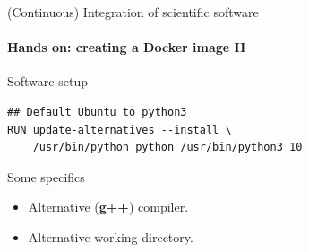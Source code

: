 \begin{frame}[fragile]{(Continuous) Integration of scientific software} 
    \framesubtitle{Hands on: creating a Docker image II} 
    \vfill

    Software setup  

    \begin{verbatim}
## Default Ubuntu to python3
RUN update-alternatives --install \
    /usr/bin/python python /usr/bin/python3 10 
    \end{verbatim}

    \medskip

    Some specifics

    \begin{itemize}
        \item Alternative (\textbf{g++}) compiler. 
        \item Alternative working directory. 
    \end{itemize}

\end{frame}

